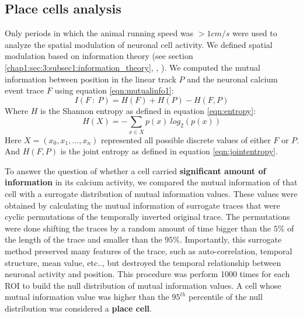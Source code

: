 \subsection{Place cells analysis}
\label{chap3:sec:7:subsec2:pc_analysis}
Only periods in which the animal running speed was $> 1 cm/s$ were used to analyze the spatial modulation of neuronal cell activity. 
We defined spatial modulation based on information theory (see section \ref{chap1:sec:3:subsec1:information_theory}, \cite{shannon1948}, \cite{quirogapanzeri2013}). 
We computed the mutual information between position in the linear track $P$ and the neuronal calcium event trace $F$ using equation \ref{eqn:mutualinfo1}:
\begin{equation}
\label{eqn:mutualinfoPF}
    I(F\ :\ P) = H(F)+H(P)-H(F , P)
\end{equation}
Where $H$ is the Shannon entropy as defined in equation \ref{eqn:entropy}:
\begin{equation}
    H(X)= -\sum_{x\in X}p(x)\ log_2(p(x))
\end{equation}
Here $X = (x_0, x_1, ... , x_n)$ represented all possible discrete values of either $F$ or $P$.
And $H(F,P)$ is the joint entropy as defined in equation \ref{eqn:jointentropy}.

To answer the question of whether a cell carried \textbf{significant amount of information} in its calcium activity, we compared the mutual information of that cell with a surrogate distribution of mutual information values. 
These values were obtained by calculating the mutual information of surrogate traces that were cyclic permutations of the temporally inverted original trace.
The permutations were done shifting the traces by a random amount of time bigger than the $5\%$ of the length of the trace and smaller than the $95\%$.
Importantly, this surrogate method preserved many features of the trace, such as auto-correlation, temporal structure, mean value, etc.., but destroyed the temporal relationship between neuronal activity and position.  
This procedure was perform 1000 times for each ROI to build the null distribution of mutual information values.
A cell whose mutual information value was higher than the $95^{th}$ percentile of the null distribution was considered a \textbf{place cell}. 

